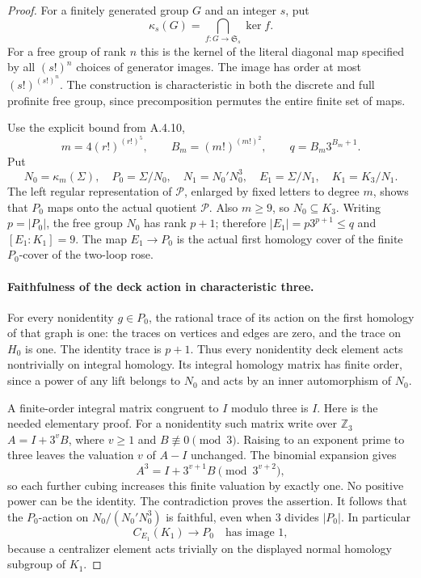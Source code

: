 \begin{proof}
For a finitely generated group $G$ and an integer $s$, put
\[
 \kappa_s(G)=\bigcap_{f:G\to\mathfrak S_s}\ker f.
                                                        \tag{DR.3}
\]
For a free group of rank $n$ this is the kernel of the
literal diagonal map specified by all $(s!)^n$ choices
of generator images.  The image has order at most
$(s!)^{(s!)^n}$.
The construction is characteristic in both the discrete
and full profinite free group, since precomposition
permutes the entire finite set of maps.

Use the explicit bound from A.4.10,
\[
 m=4(r!)^{(r!)^5},\qquad
 B_m=(m!)^{(m!)^2},\qquad q=B_m3^{B_m+1}.
                                                        \tag{DR.4}
\]
Put
\[
 N_0=\kappa_m(\Sigma),\quad P_0=\Sigma/N_0,
 \quad N_1=N_0'N_0^3,\quad E_1=\Sigma/N_1,
 \quad K_1=K_3/N_1.
                                                        \tag{DR.5}
\]
The left regular representation of $\mathcal P$, enlarged
by fixed letters to degree $m$, shows that $P_0$ maps
onto the actual quotient $\mathcal P$.
Also $m\geq9$, so $N_0\subseteq K_3$.
Writing $p=|P_0|$, the free group $N_0$ has rank $p+1$;
therefore
$|E_1|=p3^{p+1}\leq q$ and $[E_1:K_1]=9$.
The map $E_1\to P_0$ is the actual first homology cover
of the finite $P_0$-cover of the two-loop rose.

\paragraph{Faithfulness of the deck action in characteristic three.}
For every nonidentity $g\in P_0$, the rational trace of
its action on the first homology of that graph is one:
the traces on vertices and edges are zero, and the
trace on $H_0$ is one.
The identity trace is $p+1$.  Thus every nonidentity
deck element acts nontrivially on integral homology.
Its integral homology matrix has finite order, since
a power of any lift belongs to $N_0$ and acts by an
inner automorphism of $N_0$.

A finite-order integral matrix congruent to $I$ modulo
three is $I$.  Here is the needed elementary proof.
For a nonidentity such matrix write over $\mathbb Z_3$
$A=I+3^vB$, where $v\geq1$ and $B\not\equiv0\pmod3$.
Raising to an exponent prime to three leaves the
valuation $v$ of $A-I$ unchanged.
The binomial expansion gives
\[
 A^3=I+3^{v+1}B\pmod {3^{v+2}},
                                                        \tag{DR.6}
\]
so each further cubing increases this finite valuation
by exactly one.  No positive power can be the identity.
The contradiction proves the assertion.
It follows that the $P_0$-action on
$N_0/(N_0'N_0^3)$ is faithful, even when $3$ divides
$|P_0|$.
In particular
\[
 C_{E_1}(K_1)\longrightarrow P_0
           \quad\text{has image }1,                  \tag{DR.7}
\]
because a centralizer element acts trivially on the
displayed normal homology subgroup of $K_1$.


\end{proof}
